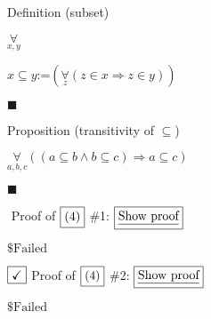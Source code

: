 \documentclass{article}
\newcommand{\mathsym}[1]{{}}
\begin{document}
Definition (subset)

\(\underset{x,y}{\forall }\)

\(x\subseteq y\text{:=}\left(\underset{z}{\forall }(z\in x\Rightarrow z\in y)\right)\)

$\blacksquare$





Proposition (transitivity of $\subseteq $)

\(\underset{a,b,c}{\forall }((a\subseteq b\land b\subseteq c)\Rightarrow a\subseteq c)\)

$\blacksquare$



\(\mathsym{\WarningSign}\) Proof of \(\fbox{$\text{(4)}$}\) $\#$1: { } \(\fbox{$\underline{\text{Show proof}}$}\)

\(\text{$\$$Failed}\)

\(\fbox{\checkmark}\) Proof of \(\fbox{$\text{(4)}$}\) $\#$2: { } \(\fbox{$\underline{\text{Show proof}}$}\)

\(\text{$\$$Failed}\)
\end{document}
